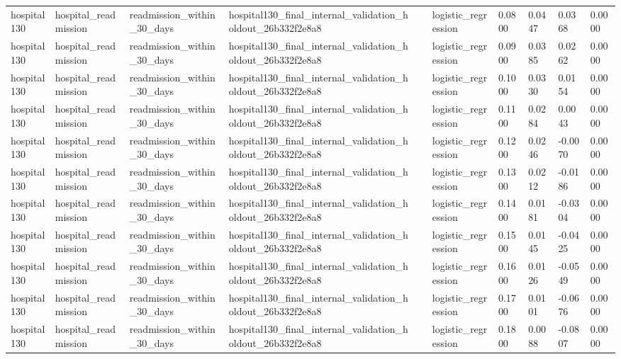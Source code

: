 \begin{tabular}{llllllllll}
hospital130 & hospital\_readmission & readmission\_within\_30\_days & hospital130\_final\_internal\_validation\_holdout\_26b332f2e8a8 &  & logistic\_regression & 0.0800 & 0.0447 & 0.0368 & 0.0000 \\
hospital130 & hospital\_readmission & readmission\_within\_30\_days & hospital130\_final\_internal\_validation\_holdout\_26b332f2e8a8 &  & logistic\_regression & 0.0900 & 0.0385 & 0.0262 & 0.0000 \\
hospital130 & hospital\_readmission & readmission\_within\_30\_days & hospital130\_final\_internal\_validation\_holdout\_26b332f2e8a8 &  & logistic\_regression & 0.1000 & 0.0330 & 0.0154 & 0.0000 \\
hospital130 & hospital\_readmission & readmission\_within\_30\_days & hospital130\_final\_internal\_validation\_holdout\_26b332f2e8a8 &  & logistic\_regression & 0.1100 & 0.0284 & 0.0043 & 0.0000 \\
hospital130 & hospital\_readmission & readmission\_within\_30\_days & hospital130\_final\_internal\_validation\_holdout\_26b332f2e8a8 &  & logistic\_regression & 0.1200 & 0.0246 & -0.0070 & 0.0000 \\
hospital130 & hospital\_readmission & readmission\_within\_30\_days & hospital130\_final\_internal\_validation\_holdout\_26b332f2e8a8 &  & logistic\_regression & 0.1300 & 0.0212 & -0.0186 & 0.0000 \\
hospital130 & hospital\_readmission & readmission\_within\_30\_days & hospital130\_final\_internal\_validation\_holdout\_26b332f2e8a8 &  & logistic\_regression & 0.1400 & 0.0181 & -0.0304 & 0.0000 \\
hospital130 & hospital\_readmission & readmission\_within\_30\_days & hospital130\_final\_internal\_validation\_holdout\_26b332f2e8a8 &  & logistic\_regression & 0.1500 & 0.0145 & -0.0425 & 0.0000 \\
hospital130 & hospital\_readmission & readmission\_within\_30\_days & hospital130\_final\_internal\_validation\_holdout\_26b332f2e8a8 &  & logistic\_regression & 0.1600 & 0.0126 & -0.0549 & 0.0000 \\
hospital130 & hospital\_readmission & readmission\_within\_30\_days & hospital130\_final\_internal\_validation\_holdout\_26b332f2e8a8 &  & logistic\_regression & 0.1700 & 0.0101 & -0.0676 & 0.0000 \\
hospital130 & hospital\_readmission & readmission\_within\_30\_days & hospital130\_final\_internal\_validation\_holdout\_26b332f2e8a8 &  & logistic\_regression & 0.1800 & 0.0088 & -0.0807 & 0.0000 \\

\end{tabular}
